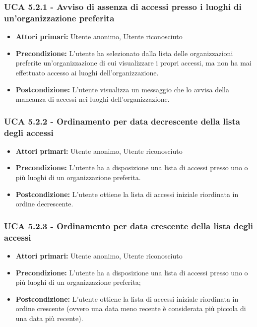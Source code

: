 \subsubsection{UCA 5.2.1 - Avviso di assenza di accessi presso i luoghi di un'organizzazione preferita}
\begin{itemize}
    \item \textbf{Attori primari:} Utente anonimo, Utente riconosciuto
    \item \textbf{Precondizione:} L'utente ha selezionato dalla lista delle organizzazioni preferite un'organizzazione di cui visualizzare i propri accessi, ma non ha mai effettuato accesso ai luoghi dell'organizzazione.
    \item \textbf{Postcondizione:} L'utente visualizza un messaggio che lo avvisa della mancanza di accessi nei luoghi dell'organizzazione.
\end{itemize}

\subsubsection{UCA 5.2.2 - Ordinamento per data decrescente della lista degli accessi}
\begin{itemize}
    \item \textbf{Attori primari:} Utente anonimo, Utente riconosciuto
    \item \textbf{Precondizione:} L'utente ha a disposizione una lista di accessi presso uno o più luoghi di un organizzazione preferita.
    \item \textbf{Postcondizione:} L'utente ottiene la lista di accessi iniziale riordinata in ordine decrescente.
\end{itemize}

\subsubsection{UCA 5.2.3 - Ordinamento per data crescente della lista degli accessi}
\begin{itemize}
    \item \textbf{Attori primari:} Utente anonimo, Utente riconosciuto
    \item \textbf{Precondizione:} L'utente ha a disposizione una lista di accessi presso uno o più luoghi di un organizzazione preferita;
    \item \textbf{Postcondizione:} L'utente ottiene la lista di accessi iniziale riordinata in ordine crescente (ovvero una data meno recente è considerata più piccola di una data più recente).
\end{itemize}

